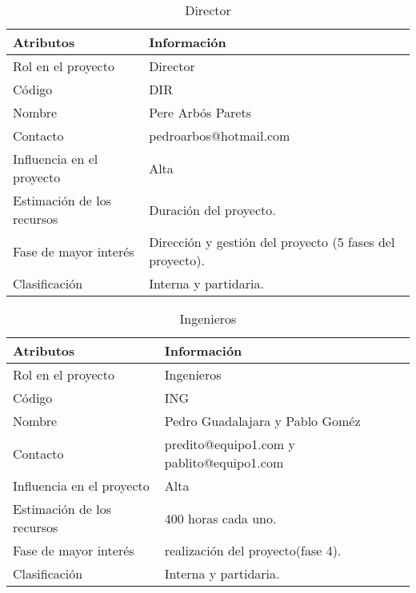 \begin{table}[H]
\centering
\begin{tabular}{|m{5cm}|m{11cm}| }
\hline
\rowcolor{gray!50} \centering Atributos & Información  \\
\hline
\hline
 Rol en el proyecto & Director \\
 \hline
 Código & DIR \\
 \hline
 Nombre & Pere Arbós Parets \\
\hline
 Contacto & pedroarbos@hotmail.com \\
\hline
 Influencia en el proyecto & Alta \\
\hline
 Estimación de los recursos &  Duración del proyecto. \\
\hline
 Fase de mayor interés & Dirección y gestión del proyecto (5 fases del proyecto). \\
\hline
Clasificación & Interna y partidaria.\\
 \hline
\end{tabular}
\caption{Director}
\label{table:ta1}
\end{table}
\begin{table}[H]
\centering
\begin{tabular}{|m{5cm}|m{11cm}| }
\hline
\rowcolor{gray!50} \centering Atributos & Información  \\
\hline
\hline
 Rol en el proyecto & Ingenieros \\
 \hline
 Código & ING \\
 \hline
 Nombre & Pedro Guadalajara y Pablo Goméz \\
\hline
 Contacto & predito@equipo1.com y pablito@equipo1.com \\
\hline
 Influencia en el proyecto & Alta \\
\hline
 Estimación de los recursos & 400 horas cada uno. \\
\hline
 Fase de mayor interés & realización del proyecto(fase 4).\\
\hline
Clasificación & Interna y partidaria.\\
 \hline
\end{tabular}
\caption{Ingenieros}
\label{table:ta1}
\end{table}

